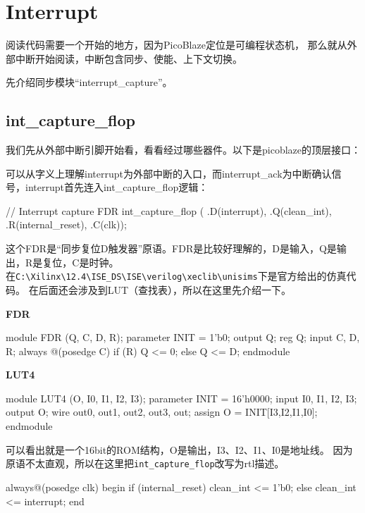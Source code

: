 \chapter{Interrupt}

阅读代码需要一个开始的地方，因为PicoBlaze定位是可编程状态机，
那么就从外部中断开始阅读，中断包含同步、使能、上下文切换。

先介绍同步模块“interrupt\_capture”。


\section{int\_capture\_flop}
我们先从外部中断引脚开始看，看看经过哪些器件。以下是picoblaze的顶层接口：



\newpage
可以从字义上理解interrupt为外部中断的入口，而interrupt\_ack为中断确认信号，interrupt首先连入int\_capture\_flop逻辑：

\begin{vcode}
// Interrupt capture
FDR int_capture_flop (
    .D(interrupt),
    .Q(clean_int),
    .R(internal_reset),
    .C(clk));
\end{vcode}

这个FDR是“同步复位D触发器”原语。FDR是比较好理解的，D是输入，Q是输出，R是复位，C是时钟。\\
在\verb|C:\Xilinx\12.4\ISE_DS\ISE\verilog\xeclib\unisims|下是官方给出的仿真代码。
在后面还会涉及到LUT（查找表），所以在这里先介绍一下。

\textbf{FDR}
\begin{vcode}
module FDR (Q, C, D, R);
    parameter INIT = 1'b0;
    output Q;
    reg    Q;
    input  C, D, R;
    always @(posedge C)
        if (R)
        Q <= 0;
        else
        Q <= D;
endmodule
\end{vcode}

\textbf{LUT4}
\begin{vcode}
module LUT4 (O, I0, I1, I2, I3);
    parameter INIT = 16'h0000;
    input I0, I1, I2, I3;
    output O;
    wire out0, out1, out2, out3, out;
    assign O = INIT[{I3,I2,I1,I0}];
endmodule
\end{vcode}

可以看出就是一个16bit的ROM结构，O是输出，I3、I2、I1、I0是地址线。
因为原语不太直观，所以在这里把\verb|int_capture_flop|改写为rtl描述。

\begin{vcode}
always@(posedge clk)
begin
    if (internal_reset)
        clean_int <= 1'b0;
    else
        clean_int <= interrupt;
end
\end{vcode}

